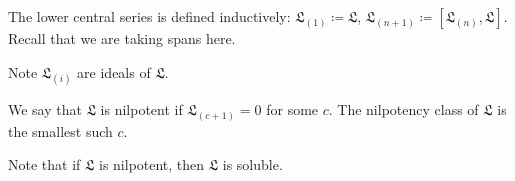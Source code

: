 The lower central series is defined inductively:
$\mathfrak{L}_{(1)}\coloneqq \mathfrak{L}$,
$\mathfrak{L}_{(n + 1)}\coloneqq [\mathfrak{L}_{(n)}, \mathfrak{L}]$. Recall
that we are taking spans here.

Note $\mathfrak{L}_{(i)}$ are ideals of $\mathfrak{L}$.

We say that  $\mathfrak{L}$ is nilpotent if $\mathfrak{L}_{(c+1)} = 0$ for
some $c$. The nilpotency class of $\mathfrak{L}$ is the smallest such $c$.

Note that if $\mathfrak{L}$ is nilpotent, then $\mathfrak{L}$ is soluble.
